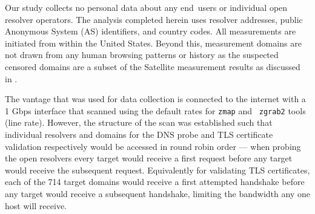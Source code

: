 Our study collects no personal data about any end~users or individual open
resolver operators. The analysis completed herein uses resolver addresses,
public Anonymous System (AS) identifiers, and country codes.  All measurements
are initiated from within the United States.
Beyond this,
measurement domains are not drawn from any human browsing patterns or history
as the suspected censored domains are a subset of the Satellite measurement
results as discussed in .

The vantage that was used for data collection is connected to the internet with
a 1 Gbps interface that scanned using the default rates for {\tt zmap} and {\tt
zgrab2} tools (line rate). However, the structure of the scan was established
such that individual resolvers and domains for the DNS probe and TLS
certificate validation respectively would be accessed in round robin order ---
\ie when probing the open resolvers every target would receive a first
request before any target would receive the subsequent request.  Equivalently
for validating TLS certificates, each of the 714 target domains would receive
a first attempted handshake before any target would receive a subsequent
handshake, limiting the bandwidth any one host will receive.


